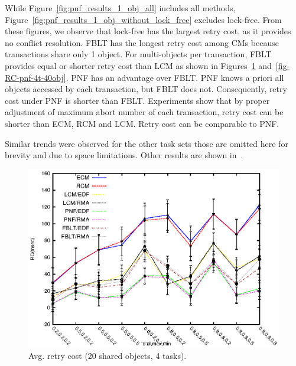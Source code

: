 \documentclass[prodmode,acmtecs]{acmsmall}
\begin{document}
\begin{compactenum}
While Figure~\ref{fig:pnf_results_1_obj_all} includes all methods, Figure~\ref{fig:pnf_results_1_obj_without_lock_free} excludes lock-free. From these figures, we observe that lock-free has the largest retry cost, as it provides no conflict resolution. FBLT has the longest retry cost among CMs because transactions share only 1 object. For multi-objects per transaction, FBLT provides equal or shorter retry cost than LCM as shown in Figures~\ref{fig-RC-pnf-4t-20obj} and~\ref{fig-RC-pnf-4t-40obj}. PNF has an advantage over FBLT. PNF knows a priori all objects accessed by each transaction, but FBLT does not. Consequently, retry cost under PNF is shorter than FBLT. Experiments show that by proper adjustment of maximum abort number of each transaction, retry cost can be shorter than ECM, RCM and LCM. Retry cost can be comparable to PNF.

 Similar trends were observed for the other task sets those are omitted here for brevity and due to space limitations. Other results are shown in~\cite{stmconcurrencycontrol_techreport}.

\begin{figure}
\centering
\includegraphics[scale=0.8]{figures/Abr_dur_4t_50obj_100wr_-1eta}
\caption{Avg. retry cost (20 shared objects, 4 tasks).}
\label{fig-RC-pnf-4t-20obj}
\end{figure}


\end{compactenum}
\end{document}
